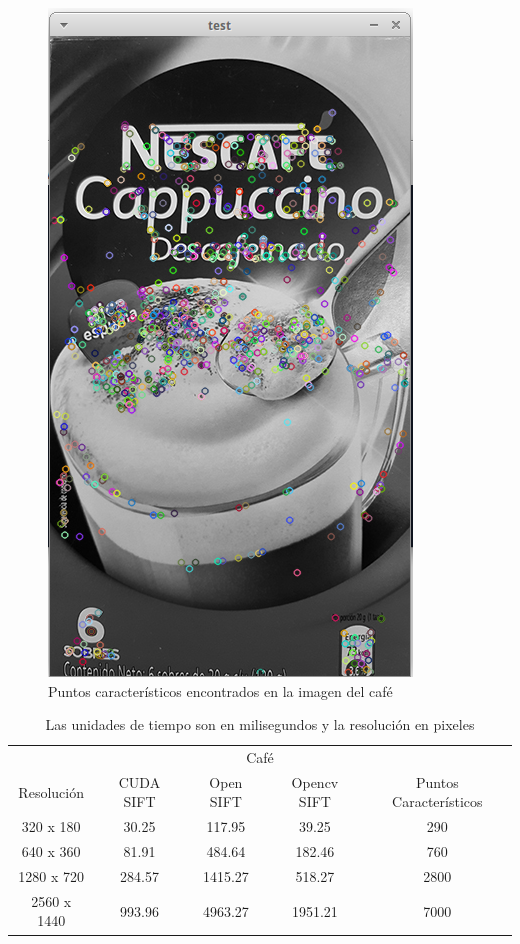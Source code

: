 \begin{figure}[ph]
			\centering
				\includegraphics[scale=0.75]{img/cafe.png}
			\caption{Puntos característicos encontrados en la imagen del café}
\end{figure}

\begin{table}[phtb]
\centering
\begin{tabular}{|c|c|c|c|c|}
\hline

\multicolumn{5}{|c|}{Café} \\
\cline{1-5}
Resolución & CUDA SIFT & Open SIFT & Opencv SIFT & Puntos Característicos\\
\hline \hline
 320 x 180  & 30.25  &  117.95  & 39.25   & 290\\ \cline{1-5}
 640 x 360  & 81.91  &  484.64  & 182.46  & 760\\ \cline{1-5}
1280 x 720  & 284.57 &  1415.27 & 518.27  & 2800\\ \cline{1-5}
2560 x 1440 & 993.96 &  4963.27 & 1951.21 & 7000\\ \cline{1-5}

\end{tabular}
\caption{Las unidades de tiempo son en milisegundos y la resolución en pixeles}
\label{tabla:final}
\end{table}

